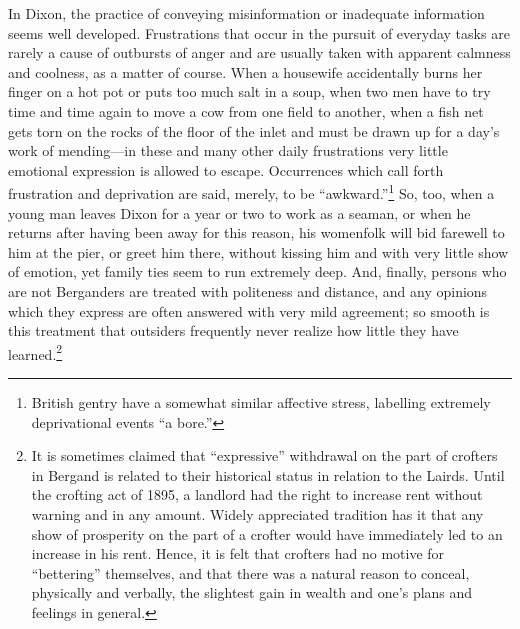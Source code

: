 \documentclass[openany,nobib]{tufte-book}
\begin{document}
\noindent In Dixon, the practice of conveying misinformation or inadequate
information seems well developed. Frustrations that occur in the pursuit
of everyday tasks are rarely a cause of outbursts of anger and are
usually taken with apparent calmness and coolness, as a matter of
course. When a housewife accidentally burns her finger on a hot pot or
puts too much salt in a soup, when two men have to try time and time
again to move a cow from one field to another, when a fish net gets torn
on the rocks of the floor of the inlet and must be drawn up for a day's
work of mending---in these and many other daily frustrations very little
emotional expression is allowed to escape. Occurrences which call forth
frustration and deprivation are said, merely, to be
``awkward.''\footnote{British gentry have a somewhat similar affective
  stress, labelling extremely deprivational events ``a bore.''} So, too,
when a young man leaves Dixon for a year or two to work as a seaman, or
when he returns after having been away for this reason, his womenfolk
will bid farewell to him at the pier, or greet him there, without
kissing him and with very little show of emotion, yet family ties seem
to run extremely deep. And, finally, persons who are not Berganders are
treated with politeness and distance, and any opinions which they
express are often answered with very mild agreement; so smooth is this
treatment that outsiders frequently never realize how little they have
learned.\footnote{It is sometimes claimed that ``expressive'' withdrawal
  on the part of crofters in Bergand is related to their historical
  status in relation to the Lairds. Until the crofting act of 1895, a
  landlord had the right to increase rent without warning and in any
  amount. Widely appreciated tradition has it that any show of
  prosperity on the part of a crofter would have immediately led to an
  increase in his rent. Hence, it is felt that crofters had no motive
  for ``bettering'' themselves, and that there was a natural reason to
  conceal, physically and verbally, the slightest gain in wealth and
  one's plans and feelings in general.}
\end{document}

